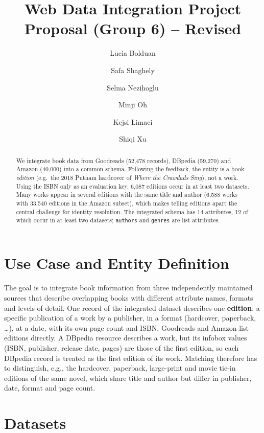 \documentclass[runningheads]{llncs}
\begin{document}
\title{Web Data Integration Project Proposal (Group 6) -- Revised}
\author{Lucia Bolduan  \and Safa Shaghely  \and Selma Nezihoglu  \and Minji Oh  \and Kejsi Limaci  \and Shiqi Xu }
\maketitle

\begin{abstract}
We integrate book data from Goodreads (52,478 records), DBpedia (59,270) and
Amazon (40,000) into a common schema. Following the feedback, the entity is a
book \emph{edition} (e.g.\ the 2018 Putnam hardcover of \emph{Where the Crawdads
Sing}), not a work. Using the ISBN only as an evaluation key, 6,087 editions
occur in at least two datasets. Many works appear in several editions with the
same title and author (6,588 works with 33,540 editions in the Amazon subset),
which makes telling editions apart the central challenge for identity
resolution. The integrated schema has 14 attributes, 12 of which occur in at
least two datasets; \texttt{authors} and \texttt{genres} are list attributes.
\end{abstract}

\section{Use Case and Entity Definition}

The goal is to integrate book information from three independently maintained
sources that describe overlapping books with different attribute names,
formats and levels of detail. One record of the integrated dataset describes
one \textbf{edition}: a specific publication of a work by a publisher, in a
format (hardcover, paperback, \dots), at a date, with its own page count and ISBN.
Goodreads and Amazon list editions directly. A DBpedia resource describes a
work, but its infobox values (ISBN, publisher, release date, pages) are those
of the first edition, so each DBpedia record is treated as the first edition of
its work. Matching therefore has to distinguish, e.g., the hardcover, paperback,
large-print and movie tie-in editions of the same novel, which share title and
author but differ in publisher, date, format and page count.

\section{Datasets}
\end{document}
